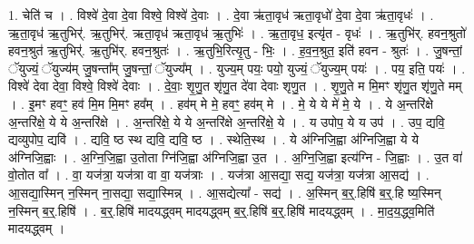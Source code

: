 \documentclass[17pt]{extarticle}
\begin{document}
1. चेति॑ च । . विश्वे॑ दे॒वा दे॒वा विश्वे॒ विश्वे॑ दे॒वाः । . दे॒वा ऋ॑ता॒वृध॑ ऋता॒वृधो॑ दे॒वा दे॒वा ऋ॑ता॒वृधः॑ । . ऋ॒ता॒वृध॑ ऋ॒तुभिर्॑. ऋ॒तुभिर्॑. ऋता॒वृध॑ ऋता॒वृध॑ ऋ॒तुभिः॑ । . ऋ॒ता॒वृध॒ इत्यृ॑त - वृधः॑ । . ऋ॒तुभि॑र्. हवन॒श्रुतो॑ हवन॒श्रुत॑ ऋ॒तुभिर्॑. ऋ॒तुभि॑र्. हवन॒श्रुतः॑ । . ऋ॒तुभि॒रित्यृ॒तु - भिः॒ । . ह॒व॒न॒श्रुत॒ इति॑ हवन - श्रुतः॑ । . जु॒षन्तां॒ ॅयुज्यं॒ ॅयुज्य॑म् जु॒षन्ता᳚म् जु॒षन्तां॒ ॅयुज्य᳚म् । . युज्य॒म् पयः॒ पयो॒ युज्यं॒ ॅयुज्य॒म् पयः॑ । . पय॒ इति॒ पयः॑ । . विश्वे॑ देवा देवा॒ विश्वे॒ विश्वे॑ देवाः । . दे॒वाः॒ शृ॒णु॒त शृ॑णु॒त दे॑वा देवाः शृणु॒त । . शृ॒णु॒ते म मि॒मꣳ शृ॑णु॒त शृ॑णु॒ते मम् । . इ॒मꣳ हवꣳ॒॒ हव॑ मि॒म मि॒मꣳ हव᳚म् । . हव॑म् मे मे॒ हवꣳ॒॒ हव॑म् मे । . मे॒ ये ये मे॑ मे॒ ये । . ये अ॒न्तरि॑क्षे अ॒न्तरि॑क्षे॒ ये ये अ॒न्तरि॑क्षे । . अ॒न्तरि॑क्षे॒ ये ये अ॒न्तरि॑क्षे अ॒न्तरि॑क्षे॒ ये । . य उपोप॒ ये य उप॑ । . उप॒ द्यवि॒ द्यव्युपोप॒ द्यवि॑ । . द्यवि॒ ष्ठ स्थ द्यवि॒ द्यवि॒ ष्ठ । . स्थेति॒स्थ । . ये अ॑ग्निजि॒ह्वा अ॑ग्निजि॒ह्वा ये ये अ॑ग्निजि॒ह्वाः । . अ॒ग्नि॒जि॒ह्वा उ॒तोता ग्नि॑जि॒ह्वा अ॑ग्निजि॒ह्वा उ॒त । . अ॒ग्नि॒जि॒ह्वा इत्य॑ग्नि - जि॒ह्वाः । . उ॒त वा॑ वो॒तोत वा᳚ । . वा॒ यज॑त्रा॒ यज॑त्रा वा वा॒ यज॑त्राः । . यज॑त्रा आ॒सद्या॒ सद्य॒ यज॑त्रा॒ यज॑त्रा आ॒सद्य॑ । . आ॒सद्या॒स्मिन् न॒स्मिन् ना॒सद्या॒ सद्या॒स्मिन्न् । . आ॒सद्येत्या᳚ - सद्य॑ । . अ॒स्मिन् ब॒र्॒.हिषि॑ ब॒र्॒.हि ष्य॒स्मिन् न॒स्मिन् ब॒र्॒.हिषि॑ । . ब॒र्॒.हिषि॑ मादयद्ध्वम् मादयद्ध्वम् ब॒र्॒.हिषि॑ ब॒र्॒.हिषि॑ मादयद्ध्वम् । . मा॒द॒य॒द्ध्व॒मिति॑ मादयद्ध्वम् । \newline
\end{document}
